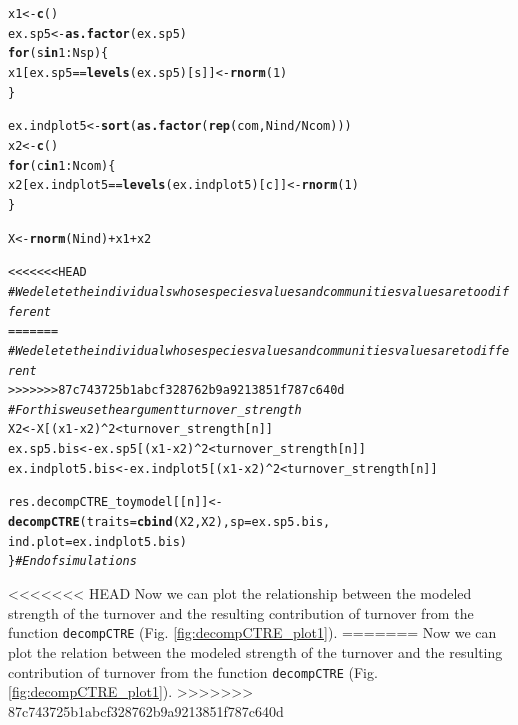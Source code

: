 \documentclass[12pt]{article}\usepackage[]{graphicx}\usepackage[]{color}
\makeatletter
\newcommand{\hlnum}[1]{\textcolor[rgb]{0.686,0.059,0.569}{#1}}%
\newcommand{\hlcom}[1]{\textcolor[rgb]{0.678,0.584,0.686}{\textit{#1}}}%
\newcommand{\hlopt}[1]{\textcolor[rgb]{0,0,0}{#1}}%
\newcommand{\hlstd}[1]{\textcolor[rgb]{0.345,0.345,0.345}{#1}}%
\newcommand{\hlkwa}[1]{\textcolor[rgb]{0.161,0.373,0.58}{\textbf{#1}}}%
\newcommand{\hlkwb}[1]{\textcolor[rgb]{0.69,0.353,0.396}{#1}}%
\newcommand{\hlkwc}[1]{\textcolor[rgb]{0.333,0.667,0.333}{#1}}%
\newcommand{\hlkwd}[1]{\textcolor[rgb]{0.737,0.353,0.396}{\textbf{#1}}}%
\newenvironment{kframe}{%
 \def\at@end@of@kframe{}%
 \ifinner\ifhmode%
  \def\at@end@of@kframe{\end{minipage}}%
  \begin{minipage}{\columnwidth}%
 \fi\fi%
 \def\FrameCommand##1{\hskip\@totalleftmargin \hskip-\fboxsep
 \colorbox{shadecolor}{##1}\hskip-\fboxsep
     \hskip-\linewidth \hskip-\@totalleftmargin \hskip\columnwidth}%
 \MakeFramed {\advance\hsize-\width
   \@totalleftmargin\z@ \linewidth\hsize
   \@setminipage}}%
 {\par\unskip\endMakeFramed%
 \at@end@of@kframe}
\newenvironment{knitrout}{}{} %
\makeatother
\begin{document}
\begin{landscape}
\begin{table}[ht]
{\begin{table}[ht]
{\begin{table}[ht]
{\begin{table}[h!]
\begin{center}
\begin{knitrout}
\begin{kframe}
\begin{alltt}
 \hlstd{x1} \hlkwb{<-} \hlkwd{c}\hlstd{()}
 \hlstd{ex.sp5} \hlkwb{<-} \hlkwd{as.factor}\hlstd{(ex.sp5)}
 \hlkwa{for}\hlstd{(s} \hlkwa{in} \hlnum{1}\hlopt{:}\hlstd{Nsp)\{}
 \hlstd{x1[ex.sp5} \hlopt{==} \hlkwd{levels}\hlstd{(ex.sp5)[s]]} \hlkwb{<-} \hlkwd{rnorm}\hlstd{(}\hlnum{1}\hlstd{)}
 \hlstd{\}}

 \hlstd{ex.indplot5} \hlkwb{<-} \hlkwd{sort}\hlstd{(}\hlkwd{as.factor}\hlstd{(}\hlkwd{rep}\hlstd{(com, Nind}\hlopt{/}\hlstd{Ncom)))}
 \hlstd{x2} \hlkwb{<-} \hlkwd{c}\hlstd{()}
 \hlkwa{for}\hlstd{(c} \hlkwa{in} \hlnum{1}\hlopt{:}\hlstd{Ncom)\{}
 \hlstd{x2[ex.indplot5} \hlopt{==} \hlkwd{levels}\hlstd{(ex.indplot5)[c]]} \hlkwb{<-} \hlkwd{rnorm}\hlstd{(}\hlnum{1}\hlstd{)}
 \hlstd{\}}

 \hlstd{X} \hlkwb{<-} \hlkwd{rnorm}\hlstd{(Nind)} \hlopt{+} \hlstd{x1} \hlopt{+} \hlstd{x2}

<<<<<<< HEAD
 \hlcom{#We delete the individuals whose species values and communities values are too different}
=======
 \hlcom{#We delete the individual whose species values and communities values are to different}
>>>>>>> 87c743725b1abcf328762b9a9213851f787c640d
 \hlcom{#For this we use the argument turnover_strength}
 \hlstd{X2} \hlkwb{<-} \hlstd{X[(x1}\hlopt{-}\hlstd{x2)}\hlopt{^}\hlnum{2} \hlopt{<} \hlstd{turnover_strength[n]]}
 \hlstd{ex.sp5.bis} \hlkwb{<-} \hlstd{ex.sp5[(x1}\hlopt{-}\hlstd{x2)}\hlopt{^}\hlnum{2} \hlopt{<} \hlstd{turnover_strength[n]]}
 \hlstd{ex.indplot5.bis} \hlkwb{<-} \hlstd{ex.indplot5[(x1}\hlopt{-}\hlstd{x2)}\hlopt{^}\hlnum{2} \hlopt{<} \hlstd{turnover_strength[n]]}

 \hlstd{res.decompCTRE_toymodel[[n]]} \hlkwb{<-} \hlkwd{decompCTRE}\hlstd{(}\hlkwc{traits} \hlstd{=} \hlkwd{cbind}\hlstd{(X2, X2),} \hlkwc{sp} \hlstd{= ex.sp5.bis,}
            \hlkwc{ind.plot} \hlstd{= ex.indplot5.bis)}
\hlstd{\}}\hlcom{#End of simulations}
\end{alltt}
\end{kframe}
\end{knitrout}
<<<<<<< HEAD
Now we can plot the relationship between the modeled strength of the turnover and the resulting contribution of turnover from the function \texttt{decompCTRE} (Fig. \ref{fig:decompCTRE_plot1}).
=======
Now we can plot the relation between the modeled strength of the turnover and the resulting contribution of turnover from the function \texttt{decompCTRE} (Fig. \ref{fig:decompCTRE_plot1}).
>>>>>>> 87c743725b1abcf328762b9a9213851f787c640d


\end{center}
\end{table}}
\end{table}}
\end{table}}
\end{table}
\end{landscape}
\end{document}
